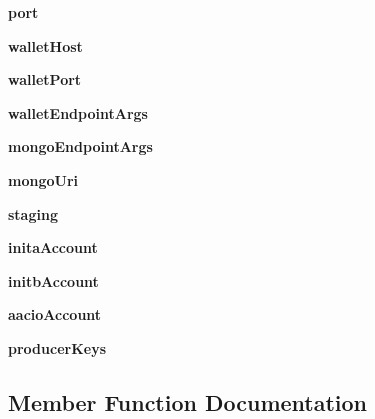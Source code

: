 \begin{DoxyCompactItemize}
{\bfseries port}
\item 
\mbox{\label{classtest_utils_1_1_cluster_ab5d93ff85e15e2ff0557e1cadc3fa382}} 
{\bfseries wallet\+Host}
\item 
\mbox{\label{classtest_utils_1_1_cluster_a8d95a97dbbfc197f25a9db1e2b549b51}} 
{\bfseries wallet\+Port}
\item 
\mbox{\label{classtest_utils_1_1_cluster_ae4dcd191941aa2901ab58f356029b21b}} 
{\bfseries wallet\+Endpoint\+Args}
\item 
\mbox{\label{classtest_utils_1_1_cluster_aa5128bba99368f9dd8a8c4cc2d12c897}} 
{\bfseries mongo\+Endpoint\+Args}
\item 
\mbox{\label{classtest_utils_1_1_cluster_a147e06aaeb08bc5188f8c8347731b23d}} 
{\bfseries mongo\+Uri}
\item 
\mbox{\label{classtest_utils_1_1_cluster_a6a310fffd0e3e53be74052eb48d6de95}} 
{\bfseries staging}
\item 
\mbox{\label{classtest_utils_1_1_cluster_ac2253ba2961def34532f06bbb1de53ed}} 
{\bfseries inita\+Account}
\item 
\mbox{\label{classtest_utils_1_1_cluster_aa789c08abf64a4ee01b5cbb7d5ab8588}} 
{\bfseries initb\+Account}
\item 
\mbox{\label{classtest_utils_1_1_cluster_aca5c4c9c9d7b115ac5905c16d05a99c6}} 
{\bfseries aacio\+Account}
\item 
\mbox{\label{classtest_utils_1_1_cluster_a538e29a1e9578c583a144cc9972e1253}} 
{\bfseries producer\+Keys}
\end{DoxyCompactItemize}


\subsection{Member Function Documentation}
\mbox{\label{classtest_utils_1_1_cluster_a687e33396d9f454532cac650058c7e63}} 
